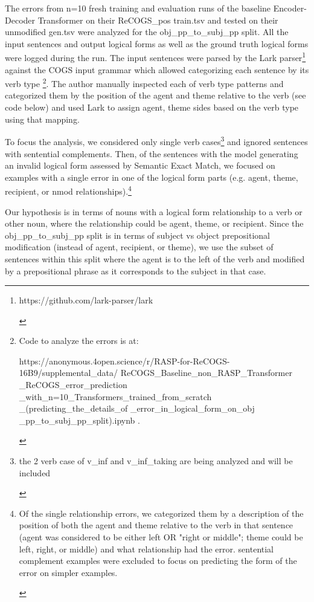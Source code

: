 \documentclass[11pt]{article}
\begin{document}
The errors from n=10 fresh training and evaluation runs of the baseline \cite{Wu2023} Encoder-Decoder Transformer on their ReCOGS\_pos train.tsv and tested on their unmodified gen.tsv were analyzed for the obj\_pp\_to\_subj\_pp split. All the input sentences and output logical forms as well as the ground truth logical forms were logged during the run. The input sentences were parsed by the Lark parser\footnote{\begin{footnotesize}https://github.com/lark-parser/lark\end{footnotesize}} against the COGS input grammar which allowed categorizing each sentence by its verb type \footnote{\begin{footnotesize}Code to analyze the errors is at: 

https://anonymous.4open.science/r/RASP-for-ReCOGS-16B9/supplemental\_data/
ReCOGS\_Baseline\_non\_RASP\_Transformer
\_ReCOGS\_error\_prediction
\_with\_n=10\_Transformers\_trained\_from\_scratch
\_(predicting\_the\_details\_of
\_error\_in\_logical\_form\_on\_obj
\_pp\_to\_subj\_pp\_split).ipynb .\end{footnotesize}}. The author manually inspected each of verb type patterns and categorized them by the position of the agent and theme relative to the verb (see code below) and used Lark to assign agent, theme sides based on the verb type using that mapping.

To focus the analysis, we considered only single verb cases\footnote{\begin{footnotesize}the 2 verb case of v\_inf and v\_inf\_taking are being analyzed and will be included\end{footnotesize}} and ignored sentences with sentential complements. Then, of the sentences with the model generating an invalid logical form assessed by Semantic Exact Match, we focused on examples with a single error in one of the logical form parts (e.g. agent, theme, recipient, or nmod relationships).\footnote{\begin{footnotesize}Of the single relationship errors, we categorized them by a description of the position of both the agent and theme relative to the verb in that sentence (agent was considered to be either left OR "right or middle"; theme could be left, right, or middle) and what relationship had the error. sentential complement examples were excluded to focus on predicting the form of the error on simpler examples.\end{footnotesize}}

Our hypothesis is in terms of nouns with a logical form relationship to a verb or other noun, where the relationship could be agent, theme, or recipient.
Since the obj\_pp\_to\_subj\_pp split is in terms of subject vs object prepositional modification (instead of agent, recipient, or theme), we use the subset of sentences within this split where the agent is to the left of the verb and modified by a prepositional phrase as it corresponds to the subject in that case.
\end{document}
